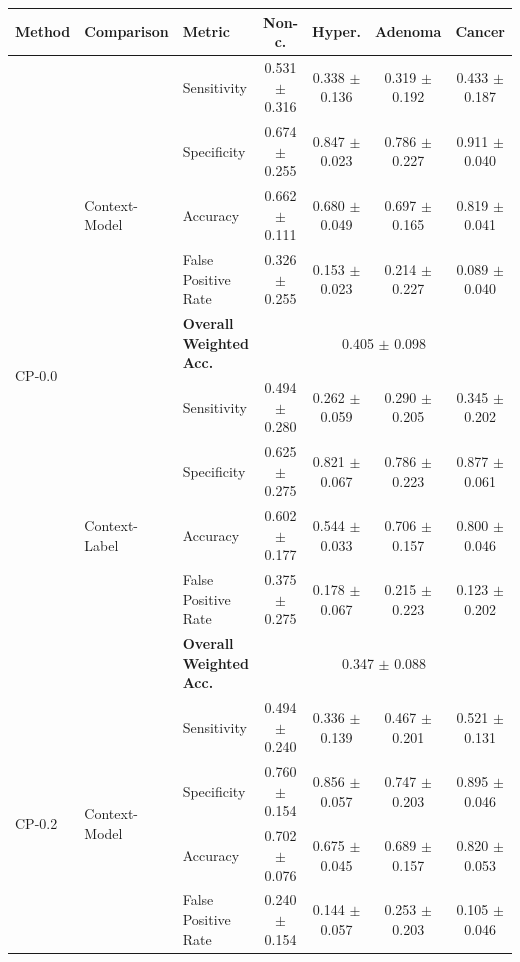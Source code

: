 \begin{table}[ht]
  \centering
  \scriptsize
  \begin{tabular}{l|llcccc}
    \toprule
    Method & Comparison & Metric & Non-c. & Hyper. & Adenoma & Cancer \\
    \midrule
\multirow{10}{*}{CP-0.0}
  & \multirow{5}{*}{Context-Model}
      & Sensitivity            & 0.531 $\pm$ 0.316 & 0.338 $\pm$ 0.136 & 0.319 $\pm$ 0.192 & 0.433 $\pm$ 0.187 \\
  &   & Specificity            & 0.674 $\pm$ 0.255 & 0.847 $\pm$ 0.023 & 0.786 $\pm$ 0.227 & 0.911 $\pm$ 0.040 \\
  &   & Accuracy               & 0.662 $\pm$ 0.111 & 0.680 $\pm$ 0.049 & 0.697 $\pm$ 0.165 & 0.819 $\pm$ 0.041 \\
  &   & False Positive Rate    & 0.326 $\pm$ 0.255 & 0.153 $\pm$ 0.023 & 0.214 $\pm$ 0.227 & 0.089 $\pm$ 0.040 \\
  &   & \textbf{Overall Weighted Acc.}
                                & \multicolumn{4}{c}{0.405 $\pm$ 0.098} \\ \cmidrule{2-7}
  & \multirow{5}{*}{Context-Label}
      & Sensitivity            & 0.494 $\pm$ 0.280 & 0.262 $\pm$ 0.059 & 0.290 $\pm$ 0.205 & 0.345 $\pm$ 0.202 \\
  &   & Specificity            & 0.625 $\pm$ 0.275 & 0.821 $\pm$ 0.067 & 0.786 $\pm$ 0.223 & 0.877 $\pm$ 0.061 \\
  &   & Accuracy               & 0.602 $\pm$ 0.177 & 0.544 $\pm$ 0.033 & 0.706 $\pm$ 0.157 & 0.800 $\pm$ 0.046 \\
  &   & False Positive Rate    & 0.375 $\pm$ 0.275 & 0.178 $\pm$ 0.067 & 0.215 $\pm$ 0.223 & 0.123 $\pm$ 0.202 \\
  &   & \textbf{Overall Weighted Acc.}
                                & \multicolumn{4}{c}{0.347 $\pm$ 0.088} \\ \midrule
\multirow{10}{*}{CP-0.2}
  & \multirow{5}{*}{Context-Model}
      & Sensitivity            & 0.494 $\pm$ 0.240 & 0.336 $\pm$ 0.139 & 0.467 $\pm$ 0.201 & 0.521 $\pm$ 0.131 \\
  &   & Specificity            & 0.760 $\pm$ 0.154 & 0.856 $\pm$ 0.057 & 0.747 $\pm$ 0.203 & 0.895 $\pm$ 0.046 \\
  &   & Accuracy               & 0.702 $\pm$ 0.076 & 0.675 $\pm$ 0.045 & 0.689 $\pm$ 0.157 & 0.820 $\pm$ 0.053 \\
  &   & False Positive Rate    & 0.240 $\pm$ 0.154 & 0.144 $\pm$ 0.057 & 0.253 $\pm$ 0.203 & 0.105 $\pm$ 0.046 \\

\end{tabular}
\end{table}
